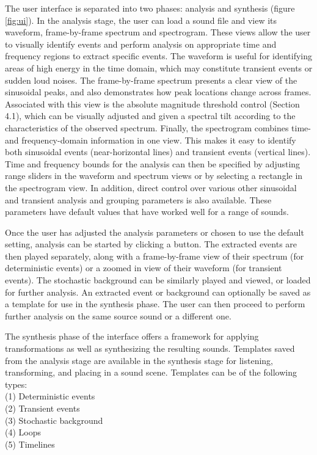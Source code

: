 \documentclass{acmsiggraph}               %
\begin{document}
The user interface is separated into two phases: analysis and synthesis 
(figure \ref{fig:ui}). 
In the analysis stage, the user can load a sound file and view its waveform, 
frame-by-frame spectrum and spectrogram. These views allow the user to visually 
identify events and perform analysis on appropriate time and frequency regions to
 extract specific events. The waveform is useful for identifying areas of high 
energy in the time domain, which may constitute transient events or sudden loud 
noises. The frame-by-frame spectrum presents a clear view of the sinusoidal 
peaks, and also demonstrates how peak locations change across frames. 
Associated with this view is the absolute magnitude threshold control (Section 4.1), 
which can be visually adjusted and given a spectral tilt according to the characteristics 
of the observed spectrum. Finally, the spectrogram combines time- and frequency-domain 
information in one view. This makes it easy to identify both sinusoidal events 
(near-horizontal lines) and transient events (vertical lines). Time and frequency 
bounds for the analysis can then be specified by adjusting range sliders in the waveform 
and spectrum views or by selecting a rectangle in the spectrogram view. In addition, 
direct control over various other sinusoidal and transient analysis and 
grouping parameters is also available. These parameters have default 
values that have worked well for a range of sounds. 

Once the user has adjusted the analysis parameters or chosen to use the default setting, 
analysis can be started by clicking a button. The extracted events are then played 
separately, along with a frame-by-frame view of their spectrum (for deterministic 
events) or a zoomed in view of their 
waveform (for transient events). The stochastic background can be similarly 
played and viewed, or loaded for further analysis. An 
extracted event or background can optionally be saved as a template for use in 
the synthesis phase. 
The user can then proceed to perform further analysis on the same source sound or 
a different one. 

The synthesis phase of the interface offers a framework for applying 
transformations as well as synthesizing the resulting sounds. Templates 
saved from the analysis stage are available in the synthesis stage for 
listening, transforming, and placing in a sound scene. Templates can be 
of the following types:\\
(1) Deterministic events\\
(2) Transient events\\
(3) Stochastic background\\
(4) Loops\\
(5) Timelines
\end{document}
